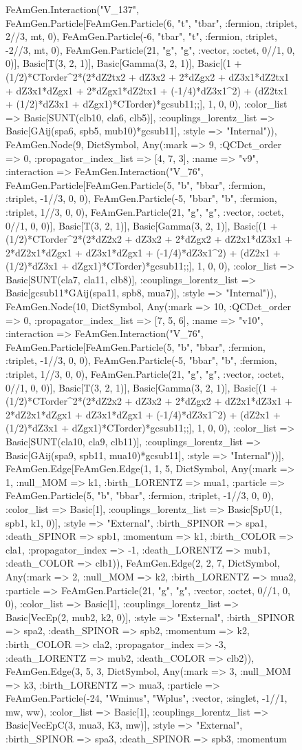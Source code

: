 \documentclass{revtex4}
\begin{document}
\begin{figure}[!htb]
\begin{center}
{FeAmGen.Interaction("V_137", FeAmGen.Particle[FeAmGen.Particle(6, "t", "tbar", :fermion, :triplet, 2//3, mt, 0), FeAmGen.Particle(-6, "tbar", "t", :fermion, :triplet, -2//3, mt, 0), FeAmGen.Particle(21, "g", "g", :vector, :octet, 0//1, 0, 0)], Basic[T(3, 2, 1)], Basic[Gamma(3, 2, 1)], Basic[(1 + (1/2)*CTorder^2*(2*dZ2tx2 + dZ3x2 + 2*dZgx2 + dZ3x1*dZ2tx1 + dZ3x1*dZgx1 + 2*dZgx1*dZ2tx1 + (-1/4)*dZ3x1^2) + (dZ2tx1 + (1/2)*dZ3x1 + dZgx1)*CTorder)*gcsub11;;], 1, 0, 0), :color_list => Basic[SUNT(clb10, cla6, clb5)], :couplings_lorentz_list => Basic[GAij(spa6, spb5, mub10)*gcsub11], :style => "Internal")), FeAmGen.Node(9, Dict{Symbol, Any}(:mark => 9, :QCDct_order => 0, :propagator_index_list => [4, 7, 3], :name => "v9", :interaction => FeAmGen.Interaction("V_76", FeAmGen.Particle[FeAmGen.Particle(5, "b", "bbar", :fermion, :triplet, -1//3, 0, 0), FeAmGen.Particle(-5, "bbar", "b", :fermion, :triplet, 1//3, 0, 0), FeAmGen.Particle(21, "g", "g", :vector, :octet, 0//1, 0, 0)], Basic[T(3, 2, 1)], Basic[Gamma(3, 2, 1)], Basic[(1 + (1/2)*CTorder^2*(2*dZ2x2 + dZ3x2 + 2*dZgx2 + dZ2x1*dZ3x1 + 2*dZ2x1*dZgx1 + dZ3x1*dZgx1 + (-1/4)*dZ3x1^2) + (dZ2x1 + (1/2)*dZ3x1 + dZgx1)*CTorder)*gcsub11;;], 1, 0, 0), :color_list => Basic[SUNT(cla7, cla11, clb8)], :couplings_lorentz_list => Basic[gcsub11*GAij(spa11, spb8, mua7)], :style => "Internal")), FeAmGen.Node(10, Dict{Symbol, Any}(:mark => 10, :QCDct_order => 0, :propagator_index_list => [7, 5, 6], :name => "v10", :interaction => FeAmGen.Interaction("V_76", FeAmGen.Particle[FeAmGen.Particle(5, "b", "bbar", :fermion, :triplet, -1//3, 0, 0), FeAmGen.Particle(-5, "bbar", "b", :fermion, :triplet, 1//3, 0, 0), FeAmGen.Particle(21, "g", "g", :vector, :octet, 0//1, 0, 0)], Basic[T(3, 2, 1)], Basic[Gamma(3, 2, 1)], Basic[(1 + (1/2)*CTorder^2*(2*dZ2x2 + dZ3x2 + 2*dZgx2 + dZ2x1*dZ3x1 + 2*dZ2x1*dZgx1 + dZ3x1*dZgx1 + (-1/4)*dZ3x1^2) + (dZ2x1 + (1/2)*dZ3x1 + dZgx1)*CTorder)*gcsub11;;], 1, 0, 0), :color_list => Basic[SUNT(cla10, cla9, clb11)], :couplings_lorentz_list => Basic[GAij(spa9, spb11, mua10)*gcsub11], :style => "Internal"))], FeAmGen.Edge[FeAmGen.Edge(1, 1, 5, Dict{Symbol, Any}(:mark => 1, :null_MOM => k1, :birth_LORENTZ => mua1, :particle => FeAmGen.Particle(5, "b", "bbar", :fermion, :triplet, -1//3, 0, 0), :color_list => Basic[1], :couplings_lorentz_list => Basic[SpU(1, spb1, k1, 0)], :style => "External", :birth_SPINOR => spa1, :death_SPINOR => spb1, :momentum => k1, :birth_COLOR => cla1, :propagator_index => -1, :death_LORENTZ => mub1, :death_COLOR => clb1)), FeAmGen.Edge(2, 2, 7, Dict{Symbol, Any}(:mark => 2, :null_MOM => k2, :birth_LORENTZ => mua2, :particle => FeAmGen.Particle(21, "g", "g", :vector, :octet, 0//1, 0, 0), :color_list => Basic[1], :couplings_lorentz_list => Basic[VecEp(2, mub2, k2, 0)], :style => "External", :birth_SPINOR => spa2, :death_SPINOR => spb2, :momentum => k2, :birth_COLOR => cla2, :propagator_index => -3, :death_LORENTZ => mub2, :death_COLOR => clb2)), FeAmGen.Edge(3, 5, 3, Dict{Symbol, Any}(:mark => 3, :null_MOM => k3, :birth_LORENTZ => mua3, :particle => FeAmGen.Particle(-24, "Wminus", "Wplus", :vector, :singlet, -1//1, mw, ww), :color_list => Basic[1], :couplings_lorentz_list => Basic[VecEpC(3, mua3, K3, mw)], :style => "External", :birth_SPINOR => spa3, :death_SPINOR => spb3, :momentum }
\end{center}
\end{figure}
\end{document}
